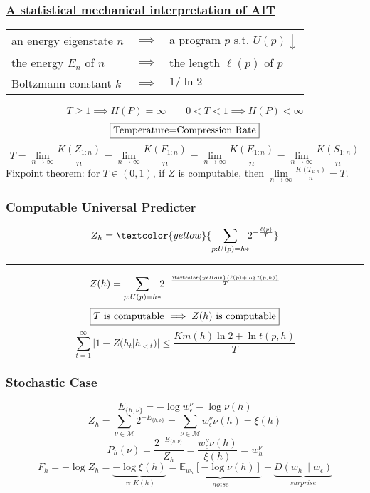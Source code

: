 \documentclass[UTF8,11pt,colorlinks,compress,openany]{beamer}%
\begin{document}
\begin{frame}\frametitle{\href{http://www2.odn.ne.jp/tadaki}{A statistical mechanical interpretation of AIT}}\centering
\begin{tabu}{lll}
	an energy eigenstate $n$ &$\implies$ &a program $p$ s.t. $U(p)\downarrow$\\
	the energy $E_n$ of $n$ &$\implies$ &the length $\ell(p)$ of $p$\\
	Boltzmann constant $k$ &$\implies$ &$1/\ln 2$
\end{tabu}
\[T\geq 1\implies H(P)=\infty\qquad 0<T<1\implies H(P)<\infty\]
\[\fbox{Temperature=Compression Rate}\]
\[T=\lim\limits_{n\to\infty}\frac{K(Z_{1:n})}{n}=\lim\limits_{n\to\infty}\frac{K(F_{1:n})}{n}=\lim\limits_{n\to\infty}\frac{K(E_{1:n})}{n}=\lim\limits_{n\to\infty}\frac{K(S_{1:n})}{n}\]
Fixpoint theorem: for $T\in(0,1)$, if $Z$ is computable, then $\lim\limits_{n\to\infty}\frac{K(T_{1:n})}{n}=T$.
\end{frame}

\begin{frame}\frametitle{Computable Universal Predicter}
\[Z_h=\textcolor{yellow}{\sum\limits_{p:U(p)=h*}\!\!2^{-\frac{\ell(p)}{T}}}\]
\hrule
\[Z(h)=\sum\limits_{p:U(p)=h*}\!\!2^{-\frac{\textcolor{yellow}{\ell(p)+\log t(p,h)}}{T}}\]
\[\fbox{$T$ is computable $\implies Z(h)$ is computable}\]
\[\sum\limits_{t=1}^\infty |1-Z(h_t|h_{<t})|\leq\dfrac{Km(h)\ln 2+\ln t(p,h)}{T}\]
\end{frame}

\begin{frame}\frametitle{Stochastic Case}
\[E_{\{h,\nu\}}=-\log w_\epsilon^\nu-\log\nu(h)\]
\[Z_h=\sum\limits_{\nu\in\mathcal{M}}2^{-E_{\{h,\nu\}}}=\sum\limits_{\nu\in\mathcal{M}}w_\epsilon^\nu\nu(h)=\xi(h)\]
\[P_h(\nu)=\frac{2^{-E_{\{h,\nu\}}}}{Z_h}=\frac{w_\epsilon^\nu\nu(h)}{\xi(h)}=w_h^\nu\]
\[F_h=-\log Z_h=\underbrace{-\log\xi(h)}_{\approx K(h)}=\underbrace{\mathbb{E}_{w_h}[-\log\nu(h)]}_{noise}+\underbrace{D(w_h\|w_\epsilon)}_{surprise}\]
\end{frame}
\end{document}
